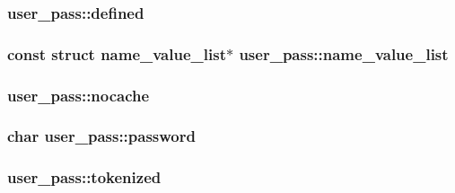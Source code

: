 \subsubsection[{defined}]{ user\+\_\+pass\+::defined}\label{structuser__pass_ad75eed178093897d95e7f8bc584397e0}
\hypertarget{structuser__pass_a7f22e07ecf56cde788167b23ab2533ea}{}
\subsubsection[{name\+\_\+value\+\_\+list}]{\setlength{\rightskip}{0pt plus 5cm}const struct {\bf name\+\_\+value\+\_\+list}$\ast$ user\+\_\+pass\+::name\+\_\+value\+\_\+list}\label{structuser__pass_a7f22e07ecf56cde788167b23ab2533ea}
\hypertarget{structuser__pass_ade9477322cbb41a905b75968d99971a8}{}
\subsubsection[{nocache}]{ user\+\_\+pass\+::nocache}\label{structuser__pass_ade9477322cbb41a905b75968d99971a8}
\hypertarget{structuser__pass_adccfd3c88600d76b99aa88926f3fb131}{}
\subsubsection[{password}]{\setlength{\rightskip}{0pt plus 5cm}char user\+\_\+pass\+::password}\label{structuser__pass_adccfd3c88600d76b99aa88926f3fb131}
\hypertarget{structuser__pass_afeb7aae9cf8bb87c4f28d4f7aa2186d6}{}
\subsubsection[{tokenized}]{ user\+\_\+pass\+::tokenized}\label{structuser__pass_afeb7aae9cf8bb87c4f28d4f7aa2186d6}
\hypertarget{structuser__pass_afd95ee9ee0c23614ce570b8bca3ad0e9}{}

